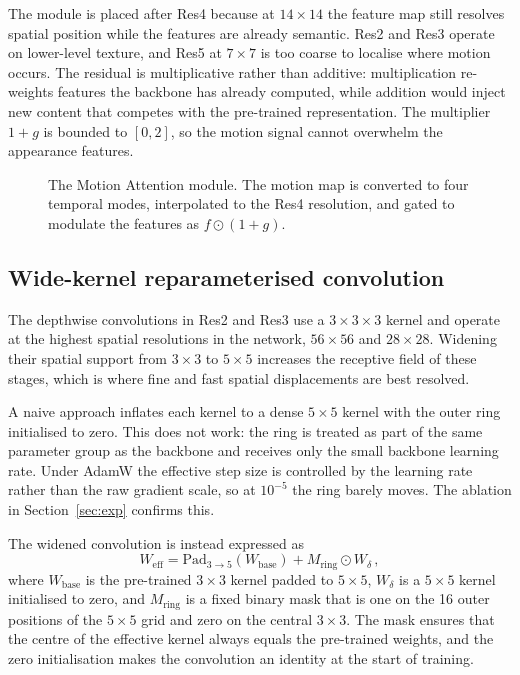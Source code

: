 \documentclass[conference]{IEEEtran}
\begin{document}
The module is placed after Res4 because at $14 \times 14$ the feature
map still resolves spatial position while the features are already
semantic. Res2 and Res3 operate on lower-level texture, and Res5 at
$7 \times 7$ is too coarse to localise where motion occurs. The
residual is multiplicative rather than additive: multiplication
re-weights features the backbone has already computed, while addition
would inject new content that competes with the pre-trained
representation. The multiplier $1 + g$ is bounded to $[0, 2]$, so the
motion signal cannot overwhelm the appearance features.

\begin{figure}[t]
  \centering
  \caption{The Motion Attention module. The motion map is converted to
  four temporal modes, interpolated to the Res4 resolution, and gated
  to modulate the features as $f \odot (1+g)$.}
  \label{fig:ma}
\end{figure}

\subsection{Wide-kernel reparameterised convolution}
\label{sec:wk}

The depthwise convolutions in Res2 and Res3 use a $3 \times 3 \times
3$ kernel and operate at the highest spatial resolutions in the network,
$56 \times 56$ and $28 \times 28$. Widening their spatial support from
$3 \times 3$ to $5 \times 5$ increases the receptive field of these
stages, which is where fine and fast spatial displacements are best
resolved.

A naive approach inflates each kernel to a dense $5 \times 5$ kernel
with the outer ring initialised to zero. This does not work: the ring
is treated as part of the same parameter group as the backbone and
receives only the small backbone learning rate. Under AdamW the
effective step size is controlled by the learning rate rather than the
raw gradient scale, so at $10^{-5}$ the ring barely moves. The ablation
in Section~\ref{sec:exp} confirms this.

The widened convolution is instead expressed as
\begin{equation}
  W_{\text{eff}} = \mathrm{Pad}_{3 \to 5}(W_{\text{base}})
    + M_{\text{ring}} \odot W_\delta \,,
  \label{eq:rep}
\end{equation}
where $W_{\text{base}}$ is the pre-trained $3 \times 3$ kernel padded
to $5 \times 5$, $W_\delta$ is a $5 \times 5$ kernel initialised to
zero, and $M_{\text{ring}}$ is a fixed binary mask that is one on the
16 outer positions of the $5 \times 5$ grid and zero on the central
$3 \times 3$. The mask ensures that the centre of the effective kernel
always equals the pre-trained weights, and the zero initialisation
makes the convolution an identity at the start of training.
\end{document}
